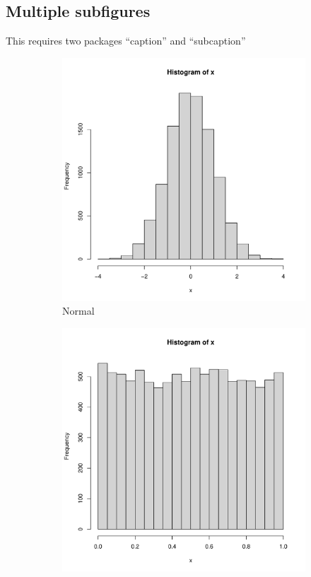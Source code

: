\documentclass[11pt]{article}
\theoremstyle{quest}
\begin{document}
\subsection{Multiple subfigures}
This requires two packages ``caption'' and ``subcaption''  
\begin{figure}
     \centering
     \begin{subfigure}[b]{0.3\textwidth}
         \centering
         \includegraphics[width=\textwidth]{figs/normal.pdf}
         \caption{Normal}
     \end{subfigure}
     \hfill
     \begin{subfigure}[b]{0.3\textwidth}
         \centering
         \includegraphics[width=\textwidth]{figs/unif.pdf}

\end{subfigure}
\end{figure}
\end{document}
